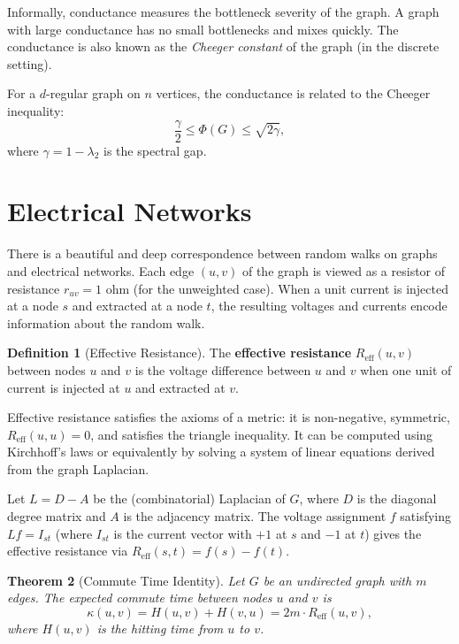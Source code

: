 \documentclass[twoside,12pt]{book}
\theoremstyle{plain}
\newtheorem{theorem}{Theorem}[chapter]
\theoremstyle{definition}
\newtheorem{definition}[theorem]{Definition}
\theoremstyle{remark}
\begin{document}
Informally, conductance measures the bottleneck severity of the graph. A
graph with large conductance has no small bottlenecks and mixes quickly.
The conductance is also known as the \emph{Cheeger constant} of the graph
(in the discrete setting).

For a $d$-regular graph on $n$ vertices, the conductance is related to the
Cheeger inequality:
\[
    \frac{\gamma}{2} \leq \Phi(G) \leq \sqrt{2\gamma},
\]
where $\gamma = 1 - \lambda_2$ is the spectral gap.

\section{Electrical Networks}
\label{sec:electrical-networks}

There is a beautiful and deep correspondence between random walks on
graphs and electrical networks. Each edge $(u,v)$ of the graph is viewed
as a resistor of resistance $r_{uv} = 1$ ohm (for the unweighted case).
When a unit current is injected at a node $s$ and extracted at a node $t$,
the resulting voltages and currents encode information about the random
walk.

\begin{definition}[Effective Resistance]\label{def:eff-resistance}
The \textbf{effective resistance} $R_{\mathrm{eff}}(u,v)$ between nodes
$u$ and $v$ is the voltage difference between $u$ and $v$ when one unit
of current is injected at $u$ and extracted at $v$.
\end{definition}

Effective resistance satisfies the axioms of a metric: it is non-negative,
symmetric, $R_{\mathrm{eff}}(u,u) = 0$, and satisfies the triangle
inequality. It can be computed using Kirchhoff's laws or equivalently by
solving a system of linear equations derived from the graph Laplacian.

Let $L = D - A$ be the (combinatorial) Laplacian of $G$, where $D$ is the
diagonal degree matrix and $A$ is the adjacency matrix. The voltage
assignment $f$ satisfying $L f = I_{st}$ (where $I_{st}$ is the current
vector with $+1$ at $s$ and $-1$ at $t$) gives the effective resistance
via $R_{\mathrm{eff}}(s,t) = f(s) - f(t)$.

\begin{theorem}[Commute Time Identity]\label{thm:commute-time}
Let $G$ be an undirected graph with $m$ edges. The expected commute time
between nodes $u$ and $v$ is
\[
    \kappa(u,v) = H(u,v) + H(v,u) = 2m \cdot R_{\mathrm{eff}}(u,v),
\]
where $H(u,v)$ is the hitting time from $u$ to $v$.
\end{theorem}
\end{document}
